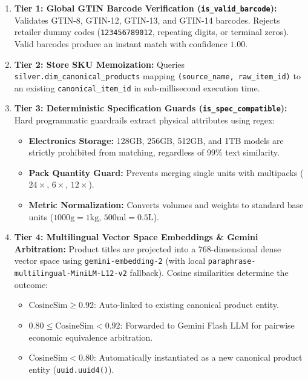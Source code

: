 \documentclass[11pt,a4paper]{article}
\begin{document}
\begin{enumerate}
    \item \textbf{Tier 1: Global GTIN Barcode Verification (\texttt{is\_valid\_barcode}):}
        Validates GTIN-8, GTIN-12, GTIN-13, and GTIN-14 barcodes. Rejects retailer dummy codes (\texttt{123456789012}, repeating digits, or terminal zeros). Valid barcodes produce an instant match with confidence $1.00$.
    \item \textbf{Tier 2: Store SKU Memoization:}
        Queries \texttt{silver.dim\_canonical\_products} mapping \texttt{(source\_name, raw\_item\_id)} to an existing \texttt{canonical\_item\_id} in sub-millisecond execution time.
    \item \textbf{Tier 3: Deterministic Specification Guards (\texttt{is\_spec\_compatible}):}
        Hard programmatic guardrails extract physical attributes using regex:
        \begin{itemize}[noitemsep]
            \item \textbf{Electronics Storage:} 128GB, 256GB, 512GB, and 1TB models are strictly prohibited from matching, regardless of 99\% text similarity.
            \item \textbf{Pack Quantity Guard:} Prevents merging single units with multipacks ($24\times$, $6\times$, $12\times$).
            \item \textbf{Metric Normalization:} Converts volumes and weights to standard base units ($1000\text{g} = 1\text{kg}$, $500\text{ml} = 0.5\text{L}$).
        \end{itemize}
    \item \textbf{Tier 4: Multilingual Vector Space Embeddings \& Gemini Arbitration:}
        Product titles are projected into a 768-dimensional dense vector space using \texttt{gemini-embedding-2} (with local \texttt{paraphrase-multilingual-MiniLM-L12-v2} fallback). Cosine similarities determine the outcome:
        \begin{itemize}[noitemsep]
            \item $\text{CosineSim} \ge 0.92$: Auto-linked to existing canonical product entity.
            \item $0.80 \le \text{CosineSim} < 0.92$: Forwarded to Gemini Flash LLM for pairwise economic equivalence arbitration.
            \item $\text{CosineSim} < 0.80$: Automatically instantiated as a new canonical product entity (\texttt{uuid.uuid4()}).
        \end{itemize}
\end{enumerate}
\end{document}

